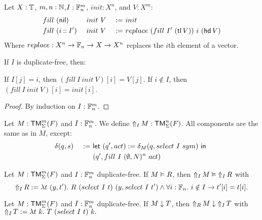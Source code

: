 \begin{definition}
  Let $X:\Type$, $m,n:\Nat$,$I:\Fin_n^m$, $init:X^n$, and $V:X^m$:
  \begin{alignat*}{3}
    & fill~(\nil      )&& ~init~V &~:=~& init \\
    & fill~(i \cons I')&& ~init~V &~:=~& replace~(fill~I'~(\tl V))~i~(\hd V)
  \end{alignat*}
  Where $replace : X^n \to \Fin_n \to X \to X^n$ replaces the $i$th element of a vector.
\end{definition}
\begin{lemma}
  If $I$ is duplicate-free, then:
  \begin{enumerate}
   \label{lem:fill_correct_nth}
    If $I[j]=i$, then $(fill~I~init~V)[i] = V[j]$.
   \label{lem:fill_not_index}
    If $i \notin I$, then $(fill~I~init~V)[i] = init[i]$.
  \end{enumerate}
\end{lemma}
\begin{proof}
  By induction on $I : \Fin_n^m$.
\end{proof}

\begin{definition}[$\LiftTapes{M}{I}$][LiftTapes]
  \label{def:LiftTapes}
  Let $M:\TM_\Sigma^m(F)$ and $I : \Fin_n^m$.  We define $\LiftTapes{M}{I} : \TM_\Sigma^n(F)$.  All components are the same as in $M$, except:
  \begin{alignat*}{2}
    &\delta(q,s) &~:=~& \Let{(q', act) := \delta_M(q, select~I~sym)}{\\%
    &            &~  ~& (q', fill~I~(\None,N)^n~act)}
  \end{alignat*}
\end{definition}

\begin{lemma}
  \label{lem:LiftTapes_Realise}
  Let $M : \TM_\Sigma^m(F)$ and $I : \Fin_n^m$ duplicate-free.  If $M \Realise R$, then $\LiftTapes{M}{I} \Realise \LiftTapes{R}{I}$ with
  \[
    \LiftTapes{R}{I} := \lambda t~(y,t').~ R~(select~I~t)~(y, select~I~t') \land \forall i:\Fin_n.~i \notin I \rightarrow t'[i]=t[i].
  \]
\end{lemma}

\begin{lemma}
  \label{lem:LiftTapes_TerminatesIn}
  Let $M : \TM_\Sigma^m(F)$ and $I : \Fin_n^m$ duplicate-free. If $M \TerminatesIn T$, then $\LiftTapes{M}{R} \TerminatesIn \LiftTapes{T}{I}$ with
  $ \LiftTapes{T}{I} := \lambda t~k.~ T~(select~I~t)~k.  $
\end{lemma}

